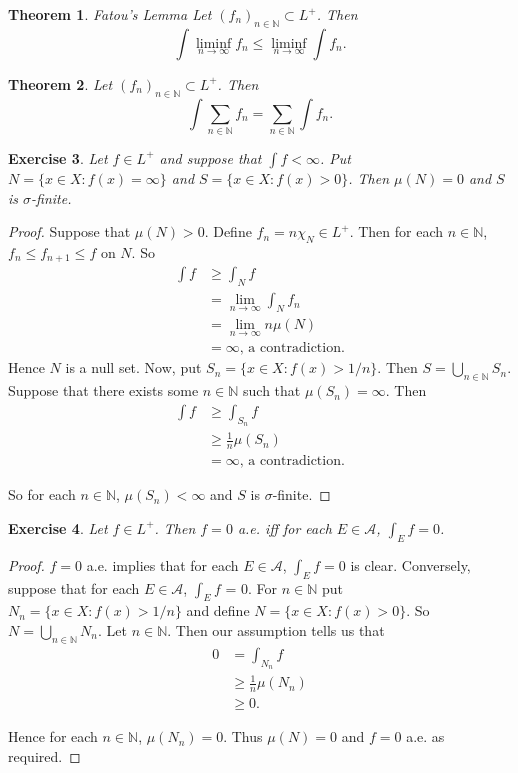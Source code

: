 \documentclass[12pt]{amsart}
\newtheorem{thm}{Theorem}[section]
\newtheorem{ex}[thm]{Exercise}
\newcommand{\sig}{\sigma}
\newcommand{\N}{\mathbb{N}}
\newcommand{\MA}{\mathcal{A}}
\newcommand{\limfn}{\liminf \limits_{n \rightarrow \infty}}
\begin{document}
\begin{thm}{Fatou's Lemma}
Let $(f_n)_{n \in \N} \subset L^+$. Then $$\int \limfn f_n \leq \limfn \int f_n.$$
\end{thm}

\begin{thm}
Let $(f_n)_{n \in \N} \subset L^+$. Then $$\int \sum_{n \in \N} f_n= \sum_{n \in \N} \int f_n.$$
\end{thm}

\begin{ex}
Let $f \in L^+$ and suppose that $\int f < \infty$. Put $N = \{x \in X: f(x) = \infty\}$ and $S = \{x \in X: f(x) > 0\}$. Then $\mu(N) = 0$ and $S$ is $\sig$-finite.
\end{ex}

\begin{proof}
Suppose that $\mu(N) > 0$. Define $f_n = n \chi_{N} \in L^+$. Then for each $n \in \N$, $f_n \leq f_{n+1} \leq f$ on $N$. So 
\begin{align*}
\int f 
&\geq \int_N f\\ 
&= \lim\limits_{n \rightarrow \infty} \int_N f_n\\ 
&= \lim\limits_{n \rightarrow \infty} n\mu(N)\\
&= \infty \text{, a contradiction.}
\end{align*}
Hence $N$ is a null set. Now, put $S_n = \{x \in X: f(x)>1/n\}$. Then $S = \bigcup \limits_{n \in \N}S_n$. Suppose that there exists some $n \in \N$ such that $\mu(S_n) = \infty$. Then 
\begin{align*}
\int f 
&\geq \int_{S_n} f \\
&\geq \frac{1}{n}\mu(S_n) \\
&= \infty \text{, a contradiction.}
\end{align*}

So for each $n \in \N$, $\mu(S_n) < \infty$ and $S$ is $\sig$-finite.

\end{proof}

\begin{ex}
Let $f \in L^+$. Then $f =0$ a.e. iff for each $E \in \MA$, $\int_E f =0$.
\end{ex}

\begin{proof}
$f = 0$ a.e. implies that for each $E \in \MA$, $\int_E f =0$ is clear. Conversely, suppose that for each $E \in \MA$, $\int_E f$ = 0. For $n \in \N$ put $N_n = \{x \in X: f(x) > 1/n\}$ and define $N = \{x \in X: f(x)>0\}$. So $N = \bigcup\limits_{n \in \N} N_n$. Let $n \in \N$. Then our assumption tells us that 
\begin{align*}
0 
&= \int_{N_n} f \\
& \geq \frac{1}{n}\mu(N_n)\\
& \geq 0.
\end{align*} 

Hence for each $n \in \N$, $\mu(N_n) = 0$. Thus $\mu(N) = 0$ and $f =0$ a.e. as required.

\end{proof}
\end{document}

